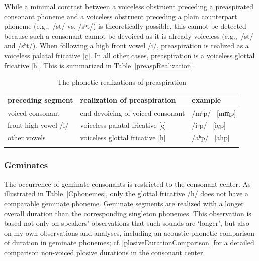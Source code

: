 While a minimal contrast between a voiceless obstruent preceding a preaspirated consonant phoneme and a voiceless obstruent preceding a plain counterpart phoneme (e.g.,~/st/ vs. /sʰt/) is theoretically possible, this cannot be detected because such a consonant cannot be devoiced as it is already voiceless (e.g.,~\mbox{/st/\ARROW [st]} and \mbox{/sʰt/\ARROW [st]}). %
When following a high front vowel /i/, preaspiration is realized as a voiceless palatal fricative [ç]. 
In all other cases, preaspiration is a voiceless glottal fricative [h]. This is summarized in Table~\vref{preaspRealization}. %
\begin{table}[ht]\centering
\caption{The phonetic realizations of preaspiration}\label{preaspRealization}
\begin{tabular}{lll}\mytoprule
{preceding segment}	& {realization of preaspiration}	&{example} \\\hline
voiced consonant		& end devoicing of voiced consonant &/mʰp/ \ARROW\ [mm̥p] \\%
front high vowel /i/		& voiceless palatal fricative [ç]	&/iʰp/ \ARROW\ [içp]\\%
other vowels			& voiceless glottal fricative [h]	&/aʰp/ \ARROW\ [ahp]\\\mybottomrule%
\end{tabular}
\end{table}


\subsubsection{Geminates}\label{geminateCs}
The occurrence of geminate consonants is restricted to the consonant center. %
As illustrated in Table~\vref{Cphonemes}, only the glottal fricative /h/ does not have a comparable geminate phoneme. %
Geminate segments are realized with a longer overall duration than the corresponding singleton phonemes. This observation is based not only on speakers’ observations that such sounds are ‘longer’, but also on my own observations and analyses, including an acoustic-phonetic comparison of duration in geminate phonemes; cf.\,\SEC\ref{plosiveDurationComparison} for a detailed comparison non-voiced plosive durations in the consonant center. 

